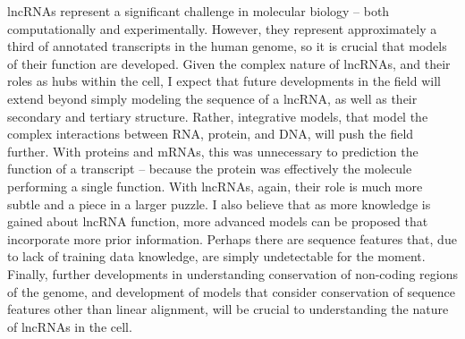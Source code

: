 lncRNAs represent a significant challenge in molecular biology -- both computationally and experimentally. However, they represent approximately a third of annotated transcripts in the human genome, so it is crucial that models of their function are developed. Given the complex nature of lncRNAs, and their roles as hubs within the cell, I expect that future developments in the field will extend beyond simply modeling the sequence of a lncRNA, as well as their secondary and tertiary structure. Rather, integrative models, that model the complex interactions between RNA, protein, and DNA, will push the field further. With proteins and mRNAs, this was unnecessary to prediction the function of a transcript -- because the protein was effectively the molecule performing a single function. With lncRNAs, again, their role is much more subtle and a piece in a larger puzzle. I also believe that as more knowledge is gained about lncRNA function, more advanced models can be proposed that incorporate more prior information. Perhaps there are sequence features that, due to lack of training data knowledge, are simply undetectable for the moment. Finally, further developments in understanding conservation of non-coding regions of the genome, and development of models that consider conservation of sequence features other than linear alignment, will be crucial to understanding the nature of lncRNAs in the cell. 

\begin{singlespace}
\printbibliography[heading=bibintoc,title={References}]
\end{singlespace}